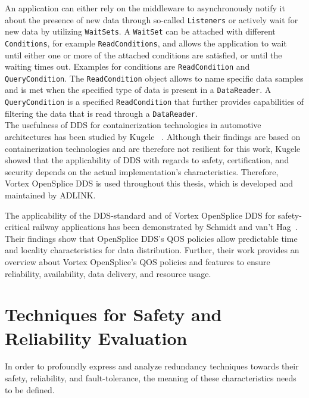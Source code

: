 An application can either rely on the middleware to asynchronously notify it about the presence of new data through so-called \texttt{Listeners} or actively wait for new data by utilizing \texttt{WaitSets}.
A \texttt{WaitSet} can be attached with different \texttt{Conditions}, for example \texttt{ReadConditions}, and allows the application to wait until either one or more of the attached conditions are satisfied, or until the waiting times out.
Examples for conditions are \texttt{ReadCondition} and \texttt{QueryCondition}.
The \texttt{ReadCondition} object allows to name specific data samples and is met when the specified type of data is present in a \texttt{DataReader}.
A \texttt{QueryCondition} is a specified \texttt{ReadCondition} that further provides capabilities of filtering the data that is read through a \texttt{DataReader}.
\\

The usefulness of \gls*{DDS} for containerization technologies in automotive architectures has been studied by Kugele \etal~\cite{KugeleDataCentricForAuto}.
Although their findings are based on containerization technologies and are therefore not resilient for this work, Kugele \etal showed that the applicability of \gls*{DDS} with regards to safety, certification, and security depends on the actual implementation's characteristics.
Therefore, Vortex OpenSplice DDS is used throughout this thesis, which is developed and maintained by ADLINK.

The applicability of the \gls*{DDS}-standard and of Vortex OpenSplice \gls*{DDS} for safety-critical railway applications has been demonstrated by Schmidt and van't Hag~\cite{SchmidtMissionCriticalChallenges}.
Their findings show that OpenSplice \gls*{DDS}'s \gls*{QOS} policies allow predictable time and locality characteristics for data distribution.
Further, their work provides an overview about Vortex OpenSplice's \gls*{QOS} policies and features to ensure reliability, availability, data delivery, and resource usage.

\section{Techniques for Safety and Reliability Evaluation}
\label{sec:techniquesSafetyReliability}
In order to profoundly express and analyze redundancy techniques towards their safety, reliability, and fault-tolerance, the meaning of these characteristics needs to be defined.
\\

